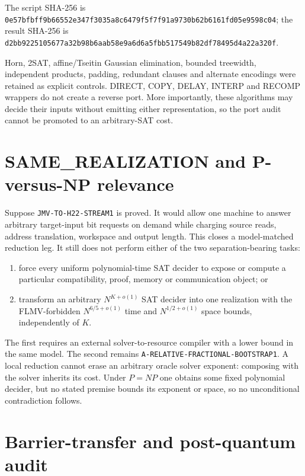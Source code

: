 \documentclass[11pt]{article}
\begin{document}
The script SHA-256 is
\nolinkurl{0e57bfbff9b66552e347f3035a8c6479f5f7f91a9730b62b6161fd05e9598c04};
the result SHA-256 is
\nolinkurl{d2bb9225105677a32b98b6aab58e9a6d6a5fbb517549b82df78495d4a22a320f}.

Horn, 2SAT, affine/Tseitin Gaussian elimination, bounded treewidth,
independent products, padding, redundant clauses and alternate encodings
were retained as explicit controls.  DIRECT, COPY, DELAY, INTERP and RECOMP
wrappers do not create a reverse port.  More importantly, these algorithms
may decide their inputs without emitting either representation, so the port
audit cannot be promoted to an arbitrary-SAT cost.

\section{SAME\_REALIZATION and P-versus-NP relevance}

Suppose \texttt{JMV-TO-H22-STREAM1} is proved.  It would allow one machine to
answer arbitrary target-input bit requests on demand while charging source
reads, address translation, workspace and output length.  This closes a
model-matched reduction leg.  It still does not perform either of the two
separation-bearing tasks:
\begin{enumerate}[nosep]
\item force every uniform polynomial-time SAT decider to expose or compute a
particular compatibility, proof, memory or communication object; or
\item transform an arbitrary $N^{K+o(1)}$ SAT decider into one realization
with the FLMV-forbidden $N^{6/5+o(1)}$ time and $N^{1/2+o(1)}$ space bounds,
independently of $K$.
\end{enumerate}
The first requires an external solver-to-resource compiler with a lower
bound in the same model.  The second remains
\texttt{A-RELATIVE-FRACTIONAL-BOOTSTRAP1}.  A local reduction cannot erase
an arbitrary oracle solver exponent: composing with the solver inherits its
cost.  Under $P=NP$ one obtains some fixed polynomial decider, but no stated
premise bounds its exponent or space, so no unconditional contradiction
follows.

\section{Barrier-transfer and post-quantum audit}
\end{document}
